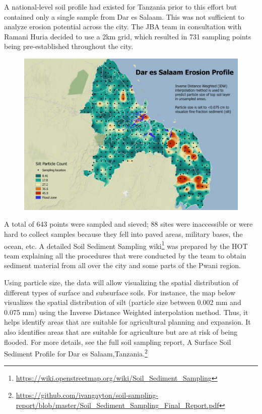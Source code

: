 \documentclass[a4paper,12pt,twoside]{article}
\begin{document}
A national-level soil profile had existed for Tanzania prior to this effort but contained only a single sample from Dar es Salaam. This was not sufficient to analyze erosion potential across the city. The JBA team in consultation with Ramani Huria decided to use a 2km grid, which resulted in 731 sampling points being pre-established throughout the city.

\begin{figure}[h]
    \centering
    \includegraphics[width=.75\textwidth]{images/erosion_Sep26_min.png}
    \label{fig:my_label}
\end{figure}

A total of 643 points were sampled and sieved; 88 sites were inaccessible or were hard to collect samples because they fell into paved areas, military bases, the ocean, etc. A detailed Soil Sediment Sampling wiki\footnote{\url{ https://wiki.openstreetmap.org/wiki/Soil_Sediment_Sampling}} was prepared by the HOT team explaining all the procedures that were conducted by the team to obtain sediment material from all over the city and some parts of the Pwani region.

Using particle size, the data will allow visualizing the spatial distribution of different types of surface and subsurface soils. For instance, the map below visualizes the spatial distribution of silt (particle size between 0.002 mm and 0.075 mm) using the Inverse Distance Weighted interpolation method. Thus, it helps identify areas that are suitable for agricultural planning and expansion. It also identifies areas that are suitable for agriculture but are at risk of being flooded. For more details, see the full soil sampling report, A Surface Soil Sediment Profile for Dar es
Salaam,Tanzania.\footnote{\url{https://github.com/ivangayton/soil-sampling-report/blob/master/Soil_Sediment_Sampling_Final_Report.pdf}}
\end{document}
